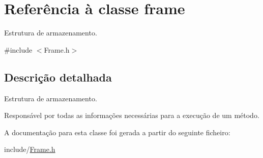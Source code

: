 \hypertarget{classframe}{}\section{Referência à classe frame}
\label{classframe}


Estrutura de armazenamento.  




{\ttfamily \#include $<$Frame.\+h$>$}



\subsection{Descrição detalhada}
Estrutura de armazenamento. 

Responsável por todas as informações necessárias para a execução de um método. 

A documentação para esta classe foi gerada a partir do seguinte ficheiro\+:\begin{DoxyCompactItemize}
\item 
include/\hyperlink{Frame_8h}{Frame.\+h}\end{DoxyCompactItemize}
